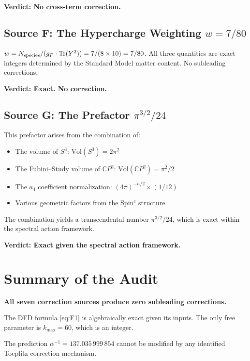 \documentclass[12pt,a4paper]{article}
\theoremstyle{definition}
\theoremstyle{remark}
\newcommand{\CP}{\mathbb{C}P}
\newcommand{\Tr}{\mathrm{Tr}}
\newcommand{\inv}{^{-1}}
\begin{document}
\textbf{Verdict: No cross-term correction.}

\subsection{Source F: The Hypercharge Weighting $w = 7/80$}
\label{sec:sourceF}

$w = N_{\rm species}/(g_F \cdot \Tr(Y^2)) = 7/(8 \times 10) = 7/80$.
All three quantities are exact integers determined by the Standard Model
matter content. No subleading corrections.

\textbf{Verdict: Exact. No correction.}

\subsection{Source G: The Prefactor $\pi^{3/2}/24$}
\label{sec:sourceG}

This prefactor arises from the combination of:
\begin{itemize}
\item The volume of $S^3$: $\mathrm{Vol}(S^3) = 2\pi^2$
\item The Fubini--Study volume of $\CP^2$: $\mathrm{Vol}(\CP^2) = \pi^2/2$
\item The $a_4$ coefficient normalization: $(4\pi)^{-n/2} \times (1/12)$
\item Various geometric factors from the Spin$^c$ structure
\end{itemize}

The combination yields a transcendental number $\pi^{3/2}/24$, which is
exact within the spectral action framework.

\textbf{Verdict: Exact given the spectral action framework.}

\section{Summary of the Audit}
\label{sec:audit-summary}

\begin{tcolorbox}[colback=green!5!white, colframe=green!60!black,
  title=Pipeline Audit Result]
\textbf{All seven correction sources produce zero subleading corrections.}

The DFD formula \eqref{eq:F1} is algebraically exact given its inputs.
The only free parameter is $k_{\max} = 60$, which is an integer.

The prediction $\alpha\inv = 137.035\,999\,854$ cannot be modified by any
identified Toeplitz correction mechanism.
\end{tcolorbox}
\end{document}
